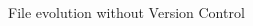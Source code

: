 \documentclass[xcolor=x11names,compress, aspectratio=169]{beamer}
\renewcommand{\(}{\begin{columns}}
\renewcommand{\)}{\end{columns}}
\newcommand{\<}[1]{\begin{column}{#1}}
\renewcommand{\>}{\end{column}}
\begin{document}
\begin{frame}{File evolution  \textcolor{brique}{without Version Control}  }
\begin{columns}[t]
\begin{column}{0.6\textwidth}
\begin{itemize}[<+->]
    \end{itemize}
 \end{column}
  \begin{column}{0.4\textwidth}
    \begin{center}
    \begin{itemize}

    \end{itemize}
    \end{center}
  \end{column}
\end{columns}
\end{frame}
\end{document}
